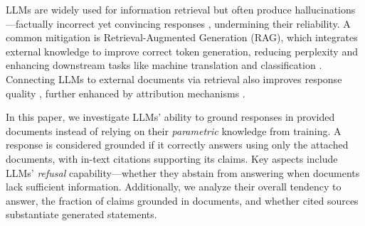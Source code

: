 \documentclass{article} %
\renewcommand{\cite}[1]{\citep{#1}}
\begin{document}



LLMs are widely used for information retrieval but often produce hallucinations—factually incorrect yet convincing responses \cite{Ji_2023}, undermining their reliability. A common mitigation is Retrieval-Augmented Generation (RAG), which integrates external knowledge to improve correct token generation, reducing perplexity \cite{khandelwal2019generalization} and enhancing downstream tasks like machine translation \cite{zheng2021adaptive} and classification \cite{bhardwaj2023knn}. Connecting LLMs to external documents via retrieval also improves response quality \cite{shuster2021retrieval, bechard2024reducing}, further enhanced by attribution mechanisms \cite{gao2023enabling, hsu2024calmcontrastinglargesmall}.

In this paper, we investigate LLMs’ ability to ground responses in provided documents instead of relying on their \textit{parametric} knowledge from training. A response is considered grounded if it correctly answers using only the attached documents, with in-text citations supporting its claims. Key aspects include LLMs' \textit{refusal} capability—whether they abstain from answering when documents lack sufficient information. Additionally, we analyze their overall tendency to answer, the fraction of claims grounded in documents, and whether cited sources substantiate generated statements.
\end{document}
